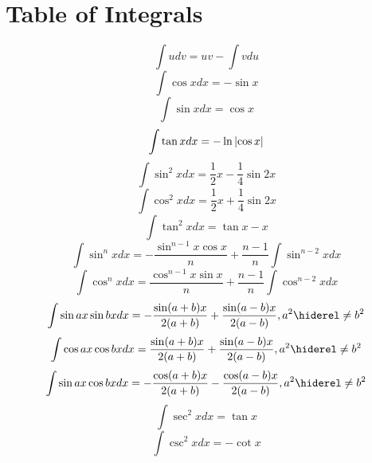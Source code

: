 \documentclass[10pt,driverfallback=hypertex]{report}
\begin{document}
\section{Table of Integrals}
\begin{dmath*}
  \int u dv = uv - \int v du
\end{dmath*}  
\begin{dmath*}
   \int \cos x dx = -\sin x
\end{dmath*}  
\begin{dmath*}
   \int \sin x dx = \cos x
\end{dmath*}  
\begin{dmath*}
   \int \tan x dx  = -\ln\abs{\cos x}
\end{dmath*}  
\begin{dmath*}
   \int \sin^2 x dx = \frac{1}{2}x - \frac{1}{4}\sin 2x
\end{dmath*}  
\begin{dmath*}
   \int \cos^2 x dx = \frac{1}{2}x + \frac{1}{4}\sin 2x
\end{dmath*}  
\begin{dmath*}  
   \int \tan^2 x dx  = \tan x - x
\end{dmath*}  
\begin{dmath*}
    \int \sin^n x dx = -\frac{\sin^{n-1}x\cos{x}}{n}
  + \frac{n-1}{n}\int\sin^{n-2}xdx
\end{dmath*}  
\begin{dmath*}  
   \int \cos^n x dx = \frac{\cos^{n-1}x\sin x}{n}
  + \frac{n-1}{n}\int \cos^{n-2}x dx
\end{dmath*}  
\begin{dmath*}
   \int \sin ax \sin bx dx = - \frac{\sin(a+b)x}{2(a+b)}
  + \frac{\sin(a-b)x}{2(a-b)},\\a^2\no\neq b^2
\end{dmath*}  
\begin{dmath*}
   \int \cos ax \cos bx dx = \frac{\sin(a+b)x}{2(a+b)}
  + \frac{\sin(a-b)x}{2(a-b)},\\ a^2\no\neq b^2
\end{dmath*}  
\begin{dmath*}
   \int \sin ax \cos bx dx = -\frac{\cos(a+b)x}{2(a+b)}
  - \frac{\cos(a-b)x}{2(a-b)},\\ a^2\no\neq b^2
\end{dmath*}  
\begin{dmath*}
   \int \sec^2 x dx = \tan x
\end{dmath*}  
\begin{dmath*}
   \int \csc^2 x dx = -\cot x
\end{dmath*}  
\end{document}
